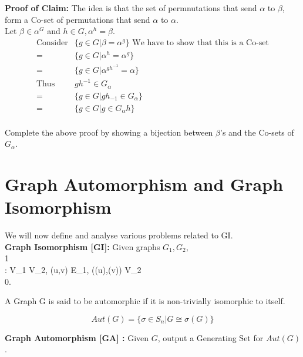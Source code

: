\textbf{Proof of Claim:}
The idea is that the set of permnutations that send $\alpha$ to $\beta$, form a Co-set of permutations that send $\alpha$ to $\alpha$.
\\
Let $\beta \in \alpha^G$ and $h \in G,\alpha^h = \beta$.\\
\begin{align*}
\text{Consider} & \{g \in G| \beta = \alpha^g\}
\text{  We have to show that this is a Co-set}\\
 = & \{ g \in G | \alpha^h = \alpha^g \}\\
 = & \{ g \in G | \alpha^{gh^{-1}} = \alpha\}\\
\text{Thus } &  gh^{-1} \in G_{\alpha}\\
 = & \{ g \in G | gh_{-1} \in G_{\alpha} \}\\
 = & \{ g \in G | g \in G_{\alpha}h \}\\
\end{align*}

\begin{exercise}
 Complete the above proof by showing a bijection between $\beta$'s and the Co-sets of $G_{\alpha}$.
\end{exercise}

\section{Graph Automorphism and Graph Isomorphism}
We will now define and analyse various problems related to GI.\\
\textbf{Graph Isomorphism [GI]: } Given graphs $G_1, G_2$,\\
  1 \\  \exists \sigma : V_1 \rightarrow V_2, \forall (u,v) \in E_1, (\sigma(u),\sigma(v)) \in V_2\\
   0.\\  

\begin{definition}[Automorphism]
A Graph G is said to be automorphic if it is non-trivially isomorphic to itself.
\end{definition}

\begin{definition}[$Aut(G)$]
\[Aut(G) = \{\sigma \in S_n | G \cong \sigma(G)\}\]
\end{definition}

\textbf{Graph Automorphism [GA] :} Given $G$, output a Generating Set for $Aut(G)$.\\

